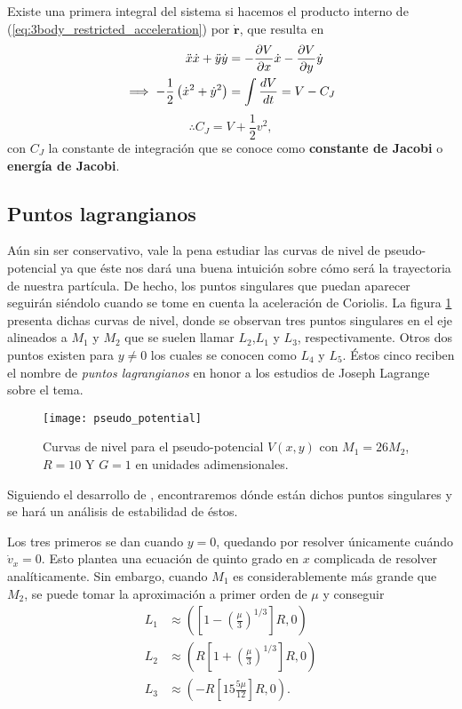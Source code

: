 Existe una primera integral del sistema si hacemos el producto interno de (\ref{eq:3body_restricted_acceleration}) por $\dot{\mathbf{r}}$, que resulta en 
\begin{align*}
 \ddot{x} \dot{x} + \ddot{y} \dot{y} &= - \frac{\partial V}{\partial x}\dot{x} - \frac{\partial V}{\partial y} \dot{y} \\
 \implies - \frac{1}{2} \left( \dot{x}^2 + \dot{y}^2 \right) &= \int \frac{d V}{dt} = V - C_J 
\end{align*}
\begin{equation}
 \therefore C_J = V + \frac{1}{2}v^2,
 \label{eq:3body_jacobi_constant}
\end{equation}
con $C_J$ la constante de integración que se conoce como \textbf{constante de Jacobi} o \textbf{energía de Jacobi}.

\subsection{Puntos lagrangianos}
\label{sec:lag_points}

Aún sin ser conservativo, vale la pena estudiar las curvas de nivel de pseudo-potencial ya que éste nos dará una buena intuición sobre cómo será la trayectoria de nuestra partícula. De hecho, los puntos singulares que puedan aparecer seguirán siéndolo cuando se tome en cuenta la aceleración de Coriolis. La figura \ref{fig:3body_pseudo_potential} presenta dichas curvas de nivel, donde se observan tres puntos singulares en el eje alineados a $M_1$ y $M_2$ que se suelen llamar $L_2$,$L_1$ y $L_3$, respectivamente. Otros dos puntos existen para $y \neq 0$ los cuales se conocen como $L_4$ y $L_5$. Éstos cinco reciben el nombre de \textit{puntos lagrangianos} en honor a los estudios de Joseph Lagrange sobre el tema.

\begin{figure}[h!]
 \centering
 \texttt{[image: pseudo\_potential]}
 \caption{Curvas de nivel para el pseudo-potencial $V(x,y)$ con $M_1 = 26M_2$, $R = 10$ Y $G=1$ en unidades adimensionales.}
 \label{fig:3body_pseudo_potential}
\end{figure}

Siguiendo el desarrollo de \cite{Cornish1998, Windall2008}, encontraremos dónde están dichos puntos singulares y se hará un análisis de estabilidad de éstos.

Los tres primeros se dan cuando $y=0$, quedando por resolver únicamente cuándo $\dot{v}_x = 0$. Esto plantea una ecuación de quinto grado en $x$ complicada de resolver analíticamente. Sin embargo, cuando $M_1$ es considerablemente más grande que $M_2$, se puede tomar la aproximación a primer orden de $\mu$ y conseguir
\begin{align}
 L_1 &\approx \left( \left[ 1 - \left(\frac{\mu}{3}\right)^{1/3} \right] R , 0 \right) \nonumber \\ 
 L_2 &\approx \left( R\left[ 1 + \left(\frac{\mu}{3}\right)^{1/3} \right] R , 0 \right) \nonumber \\
 L_3 &\approx \left( -R\left[ 1 5 \frac{5 \mu}{12} \right] R, 0 \right).
 \label{eq:3body_L123}
\end{align} 

